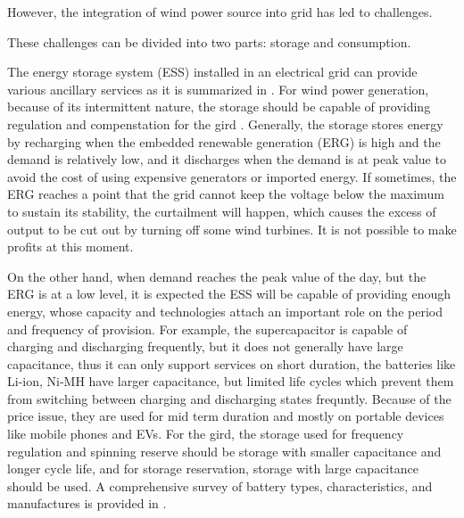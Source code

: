 \documentclass[12pt,a4paper]{report}
\begin{document}
        
        However, the integration of wind power source into grid has led to challenges.

        These challenges can be divided into two parts: storage and consumption.

        The energy storage system (ESS) installed in an electrical grid can provide various ancillary services as it is summarized in \cite{paper:Lawder2014}. 
        For wind power generation, because of its intermittent nature, the storage should be capable of providing regulation and compenstation for the gird \cite{paper:gridrisk} \cite{paper:gridscenarios}.
        Generally, the storage stores energy by recharging when the embedded renewable generation (ERG) is high and the demand is relatively low, 
        and it discharges when the demand is at peak value to avoid the cost of using expensive generators or imported energy. 
        If sometimes, the ERG reaches a point that the grid cannot keep the voltage below the maximum to sustain its stability, 
        the curtailment will happen, which causes the excess of output to be cut out by turning off some wind turbines. It is not possible to make profits 
        at this moment. 
        
        On the other hand, when demand reaches the peak value of the day, but the ERG is at a low level, 
        it is expected the ESS will be capable of providing enough energy, whose capacity and technologies attach an important role on the period and frequency
        of provision. For example, the supercapacitor is capable of charging and discharging frequently, but it does not
        generally have large capacitance, thus it can only support services on short duration, the batteries like Li-ion, Ni-MH
        have larger capacitance, but limited life cycles which prevent them from switching between charging and discharging states
        frequntly. Because of the price issue, they are used for mid term duration and mostly on portable devices like mobile phones and
        EVs. For the gird, the storage used for frequency regulation and spinning reserve should be storage with smaller capacitance and longer cycle life, and for storage reservation, storage with large capacitance should be used.
        A comprehensive survey of battery types, characteristics, and manufactures is provided in \cite{website:benson_benson_benson_benson_microgrid}.
        
\end{document}
